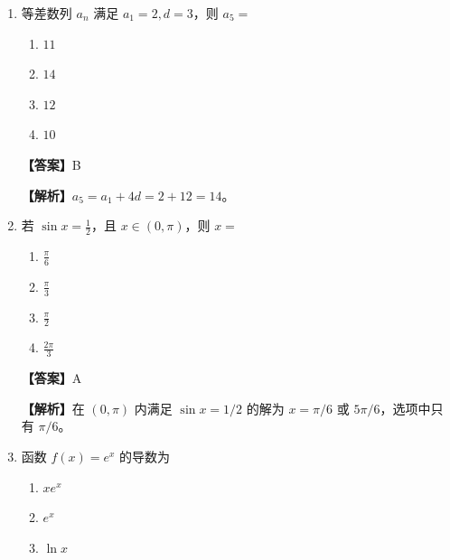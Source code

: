 \documentclass[UTF8,a4paper]{ctexart}
\begin{document}
\begin{enumerate}[leftmargin=2em,itemsep=0.8em]
\item 等差数列 $a_n$ 满足 $a_1=2, d=3$，则 $a_5=$

\begin{enumerate}[label=\Alph*.,itemsep=0.2em,parsep=0pt]

\item $11$

\item $14$

\item $12$

\item $10$

\end{enumerate}


\par\noindent\textbf{【答案】}B
\par\noindent\textbf{【解析】}$a_5=a_1+4d=2+12=14$。



\item 若 $\sin x=\frac{1}{2}$，且 $x\in(0,\pi)$，则 $x=$

\begin{enumerate}[label=\Alph*.,itemsep=0.2em,parsep=0pt]

\item $\frac{\pi}{6}$

\item $\frac{\pi}{3}$

\item $\frac{\pi}{2}$

\item $\frac{2\pi}{3}$

\end{enumerate}


\par\noindent\textbf{【答案】}A
\par\noindent\textbf{【解析】}在 $(0,\pi)$ 内满足 $\sin x=1/2$ 的解为 $x=\pi/6$ 或 $5\pi/6$，选项中只有 $\pi/6$。



\item 函数 $f(x)=e^x$ 的导数为

\begin{enumerate}[label=\Alph*.,itemsep=0.2em,parsep=0pt]

\item $xe^x$

\item $e^x$

\item $\ln x$


\end{enumerate}
\end{enumerate}
\end{document}
